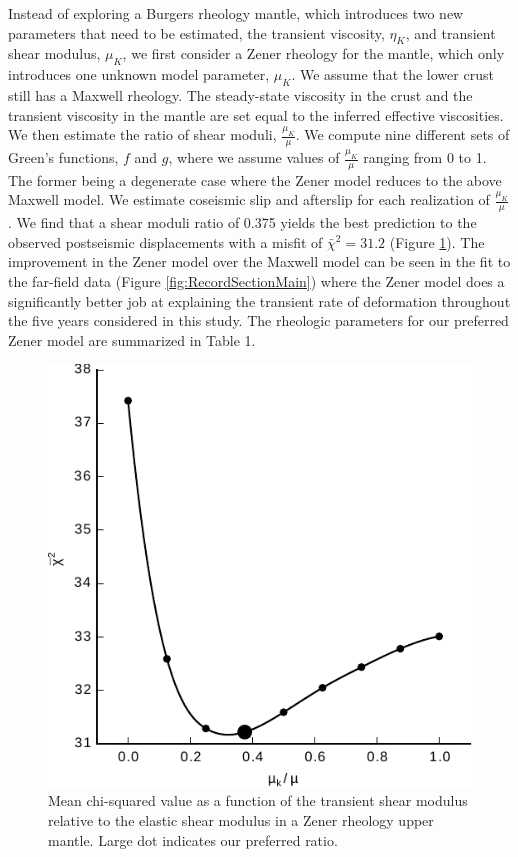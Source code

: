 \documentclass[draft,linenumbers]{AGUJournal}
\begin{document}
Instead of exploring a Burgers rheology mantle, which introduces two new parameters that need to be estimated, the transient viscosity, $\eta_{K}$, and transient shear modulus, $\mu_{K}$, we first consider a Zener rheology for the mantle, which only introduces one unknown model parameter, $\mu_{K}$.  We assume that the lower crust still has a Maxwell rheology. The steady-state viscosity in the crust and the transient viscosity in the mantle are set equal to the inferred effective viscosities.  We then estimate the ratio of shear moduli, $\frac{\mu_K}{\mu}$. We compute nine different sets of Green's functions, $f$ and $g$, where we assume values of $\frac{\mu_K}{\mu}$ ranging from 0 to 1. The former being a degenerate case where the Zener model reduces to the above Maxwell model.  We estimate coseismic slip and afterslip for each realization of $\frac{\mu_K}{\mu}$.  We find that a shear moduli ratio of 0.375 yields the best prediction to the observed postseismic displacements with a misfit of $\bar\chi^2=31.2$ (Figure \ref{fig:ShearModulusRatio}).  The improvement in the Zener model over the Maxwell model can be seen in the fit to the far-field data (Figure \ref{fig:RecordSectionMain}) where the Zener model does a significantly better job at explaining the transient rate of deformation throughout the five years considered in this study.  The rheologic parameters for our preferred Zener model are summarized in Table 1.

\begin{figure}
\includegraphics[scale=0.9]{Figures/2016jb013114-f13}
\centering 
\caption{Mean chi-squared value as a function of the transient shear modulus relative to the elastic shear modulus in a Zener rheology upper mantle. Large dot indicates our preferred ratio.}
\label{fig:ShearModulusRatio}
\end{figure}
\end{document}
